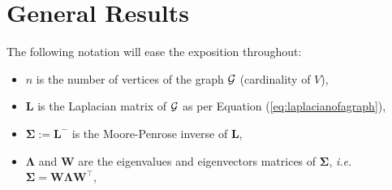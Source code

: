 \documentclass[12pt]{article}
\theoremstyle{plain}
\theoremstyle{remark}
\newcommand{\curly}[1]{\left\{ #1 \right\}}
\newcommand{\ie}{\textit{i.e. }}
\newcommand{\latMatr}[1]{\mathbf{#1}}          %
\newcommand{\grMatr}[1]{{\boldsymbol{#1}}}   %
\newcommand{\tobi}[1]{\textcolor{teal}{#1}}
\begin{document}
\section{General Results} 
\label{sec:results}
The following notation will ease the exposition throughout:
\begin{itemize}
    \item $n$ is the number of vertices of {the graph} ${\cal G}$ (cardinality of $V$),
    \item ${\latMatr{L}}$ is the Laplacian matrix of ${\cal G}$ as per Equation (\ref{eq:laplacianofagraph}), %
    \item ${\grMatr{\Sigma}}:={\latMatr{L}}^-$ is the Moore-Penrose inverse of ${\latMatr{L}}$,
    \item ${\grMatr{\Lambda}}$ and ${\latMatr{W}}$ are the eigenvalues and eigenvectors matrices of ${\grMatr{\Sigma}}$, \ie ${\grMatr{\Sigma}} = {\latMatr{W}} {\grMatr{\Lambda}} {\latMatr{W}}^\top$,

\end{itemize}
\end{document}
